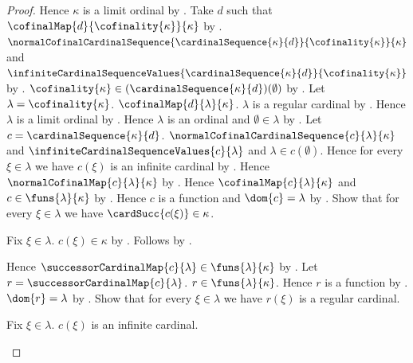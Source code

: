 \begin{proof}
    Hence $\kappa$ is a limit ordinal by
        .
    Take $d$ such that
        $\cofinalMap{d}{\cofinality{\kappa}}{\kappa}$ by
        .
    $\normalCofinalCardinalSequence
            {\cardinalSequence{\kappa}{d}}{\cofinality{\kappa}}{\kappa}$ and
        $\infiniteCardinalSequenceValues
            {\cardinalSequence{\kappa}{d}}{\cofinality{\kappa}}$ by
        .
    $\cofinality{\kappa}
        \in(\cardinalSequence{\kappa}{d})(\emptyset)$ by
        .
    Let $\lambda=\cofinality{\kappa}$.
    $\cofinalMap{d}{\lambda}{\kappa}$.
    $\lambda$ is a regular cardinal by
        .
    Hence $\lambda$ is a limit ordinal by
        .
    Hence $\lambda$ is an ordinal and $\emptyset\in\lambda$ by
        .
    Let $c=\cardinalSequence{\kappa}{d}$.
    $\normalCofinalCardinalSequence{c}{\lambda}{\kappa}$ and
        $\infiniteCardinalSequenceValues{c}{\lambda}$ and
        $\lambda\in c(\emptyset)$.
    Hence for every $\xi\in\lambda$ we have
        $c(\xi)$ is an infinite cardinal by
        .
    Hence $\normalCofinalMap{c}{\lambda}{\kappa}$ by
        .
    Hence $\cofinalMap{c}{\lambda}{\kappa}$ and
        $c\in\funs{\lambda}{\kappa}$ by
        .
    Hence $c$ is a function and $\dom{c}=\lambda$ by
        .
    Show that for every $\xi\in\lambda$ we have
        $\cardSucc{c(\xi)}\in\kappa$.
    \begin{subproof}
        Fix $\xi\in\lambda$.
        $c(\xi)\in\kappa$ by .
        Follows by
            .
    \end{subproof}
    Hence $\successorCardinalMap{c}{\lambda}
        \in\funs{\lambda}{\kappa}$ by
        .
    Let $r=\successorCardinalMap{c}{\lambda}$.
    $r\in\funs{\lambda}{\kappa}$.
    Hence $r$ is a function by .
    $\dom{r}=\lambda$ by .
    Show that for every $\xi\in\lambda$ we have
        $r(\xi)$ is a regular cardinal.
    \begin{subproof}
        Fix $\xi\in\lambda$.
        $c(\xi)$ is an infinite cardinal.

\end{subproof}
\end{proof}
